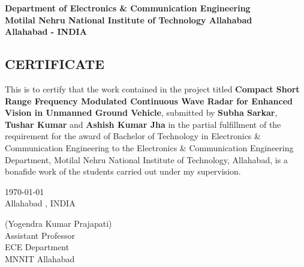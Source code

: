 \begin{center}
\begin{LARGE}
\textbf{Department of Electronics \& Communication Engineering \\
Motilal Nehru National Institute of Technology Allahabad \\
Allahabad - INDIA \\}
\end{LARGE}
\end{center}

\begin{center}
\section*{CERTIFICATE}
\end{center}

\begin{Large}
\begin{onehalfspace}
This is to certify that the work contained in the project titled 
\textbf{Compact Short Range Frequency Modulated Continuous Wave Radar for Enhanced Vision in Unmanned Ground Vehicle},
submitted by \textbf{Subha Sarkar}, \textbf{Tushar Kumar} and \textbf{Ashish Kumar Jha} in the partial fulfillment of the
requirement for the award of Bachelor of Technology in Electronics \& Communication
Engineering to the Electronics \& Communication Engineering Department, Motilal
Nehru National Institute of Technology, Allahabad, is a bonafide work of the students
carried out under my supervision.
\end{onehalfspace}
\end{Large}

\begin{Large}
\begin{onehalfspace}
\begin{flushleft}
\today \\
Allahabad , INDIA
\end{flushleft}
\end{onehalfspace}
\end{Large}

\begin{Large}
\begin{onehalfspace}
\begin{flushright}
(Yogendra Kumar Prajapati) \\
Assistant Professor \\
ECE Department \\
MNNIT Allahabad \\[0.1in]
\end{flushright}
\end{onehalfspace}
\end{Large}